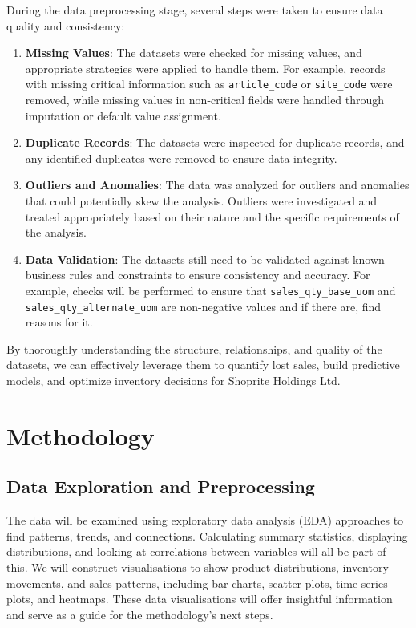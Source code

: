 \documentclass{article}
\begin{document}
During the data preprocessing stage, several steps were taken to ensure data quality and consistency:
\begin{enumerate}
  \item \textbf{Missing Values}: The datasets were checked for missing values, and appropriate strategies were applied to handle them. For example, records with missing critical information such as \texttt{article\_code} or \texttt{site\_code} were removed, while missing values in non-critical fields were handled through imputation or default value assignment.
  \item \textbf{Duplicate Records}: The datasets were inspected for duplicate records, and any identified duplicates were removed to ensure data integrity.
  \item \textbf{Outliers and Anomalies}: The data was analyzed for outliers and anomalies that could potentially skew the analysis. Outliers were investigated and treated appropriately based on their nature and the specific requirements of the analysis.
  \item \textbf{Data Validation}: The datasets still need to be validated against known business rules and constraints to ensure consistency and accuracy. For example, checks will be performed to ensure that \texttt{sales\_qty\_base\_uom} and \texttt{sales\_qty\_alternate\_uom} are non-negative values and if there are, find reasons for it.
\end{enumerate}

By thoroughly understanding the structure, relationships, and quality of the datasets, we can effectively leverage them to quantify lost sales, build predictive models, and optimize inventory decisions for Shoprite Holdings Ltd.

\section{Methodology}

\subsection{Data Exploration and Preprocessing}
The data will be examined using exploratory data analysis (EDA) approaches to find patterns, trends, and connections. Calculating summary statistics, displaying distributions, and looking at correlations between variables will all be part of this. We will construct visualisations to show product distributions, inventory movements, and sales patterns, including bar charts, scatter plots, time series plots, and heatmaps. These data visualisations will offer insightful information and serve as a guide for the methodology's next steps.
\end{document}
